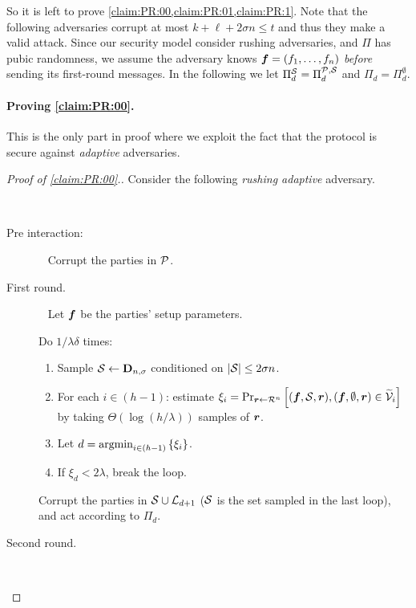 \newcommand{\PPP}{\Pi^{\cS}}


So it is left to prove \cref{claim:PR:00,claim:PR:01,claim:PR:1}. Note that the following adversaries corrupt at most $k + \ell + 2\sigma n \le t$ and thus they make a valid attack. Since our security model consider rushing adversaries, and $\Pi$ has
pubic randomness, we assume the adversary knows ${ \boldsymbol{f}} = (f_1,\ldots,f_n)$ \emph{before} sending its first-round messages. In the following we let $\PPP_d = \PP_d$ and $\Pi_d = \Pi^{\emptyset}_d$.
\paragraph{Proving \cref{claim:PR:00}.}
This is the only part in proof where we exploit the fact that the protocol is secure against \emph{adaptive} adversaries.
\begin{proof}[Proof of \cref{claim:PR:00}.]
	

Consider the following \emph{rushing adaptive} adversary.

{ \samepage
\begin{algorithm}[$\Ac$]\label{alg:PR:00}~
		
\begin{description}
	
\item[Pre interaction:]~
Corrupt the parties in $\mathcal{P}$.

\item[First round.] ~
Let ${ \boldsymbol{f}}$ be the parties' setup parameters.

Do $1/\lambda\delta$ times:
\begin{enumerate}
	\item  Sample  $\mathcal{S} \gets \mathbf{D}_{n,\sigma} $ conditioned on $ \left|{\cal{S}}\right| \le 2\sigma n$.
	\item  	For each   $i\in (h-1)$: estimate $\xi_i =  \Pr_{{ \boldsymbol{r}} \gets \mathcal{R}^n}\left[({ \boldsymbol{f}},{\cal{S}},{ \boldsymbol{r}}),({ \boldsymbol{f}},\emptyset,{ \boldsymbol{r}})  \in \widetilde{\mathcal{V}}_{i}\right]$ by taking $\Theta( \log (h/ \lambda))$ samples of ${ \boldsymbol{r}}$.
	
	\item Let $d = \operatorname*{argmin}_{i\in (h-1)} \left\{\xi_i\right\}$.
			
	\item If $\xi_d < 2\lambda$, break the loop.
\end{enumerate}
		
Corrupt the parties in ${\cal{S}} \cup {\cal{L}}_{d+1}$ (${\cal{S}}$ is the set sampled in the last loop), and act according to $\Pi_d$.

\item[Second round.]~


\end{description}
\end{algorithm}}
\end{proof}
